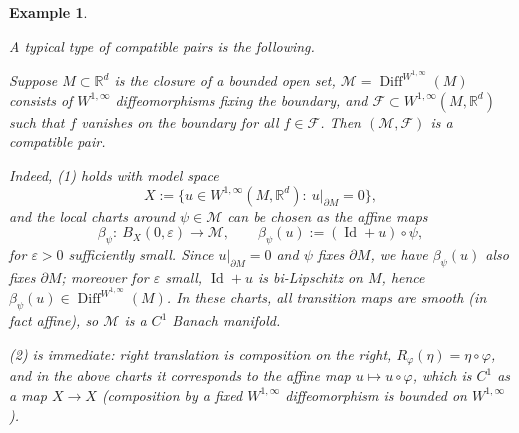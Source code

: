 \documentclass[12pt]{amsart}
\numberwithin{equation}{section}
\newtheorem{example}{Example}[section]
\theoremstyle{remark}
\begin{document}
\begin{example}\label{rem:good-pair-examples}

A typical type of compatible pairs is the following.

Suppose $M\subset \mathbb R^d$ is the closure of a bounded open set, $\mathcal M=\operatorname{Diff}^{W^{1,\infty}}(M)$
consists of $W^{1,\infty}$ diffeomorphisms fixing the boundary, and $\mathcal F\subset W^{1,\infty}(M,\mathbb R^d)$ such that $f$ vanishes on the boundary for all $f\in\mathcal F$. Then $(\mathcal M,\mathcal F)$ is a compatible pair.

Indeed, \textup{(1)} holds with model space
\begin{equation}
X:=\{u\in W^{1,\infty}(M,\mathbb R^d):\ u|_{\partial M}=0\},
\end{equation}
and the local charts around $\psi\in\mathcal M$ can be chosen as the affine maps
\begin{equation}
\beta_\psi:\ B_X(0,\varepsilon)\to \mathcal M,\qquad \beta_\psi(u):=(\operatorname{Id}+u)\circ\psi,
\end{equation}
for $\varepsilon>0$ sufficiently small.
Since $u|_{\partial M}=0$ and $\psi$ fixes $\partial M$, we have $\beta_\psi(u)$ also fixes $\partial M$; moreover for $\varepsilon$ small,
$\operatorname{Id}+u$ is bi-Lipschitz on $M$, hence $\beta_\psi(u)\in \operatorname{Diff}^{W^{1,\infty}}(M)$.
In these charts, all transition maps are smooth (in fact affine), so $\mathcal M$ is a $C^1$ Banach manifold.

\textup{(2)} is immediate: right translation is composition on the right,
$R_\varphi(\eta)=\eta\circ\varphi$, and in the above charts it corresponds to the affine map
$u\mapsto u\circ\varphi$, which is $C^1$ as a map $X\to X$ (composition by a fixed $W^{1,\infty}$ diffeomorphism is bounded on $W^{1,\infty}$).


\end{example}
\end{document}
